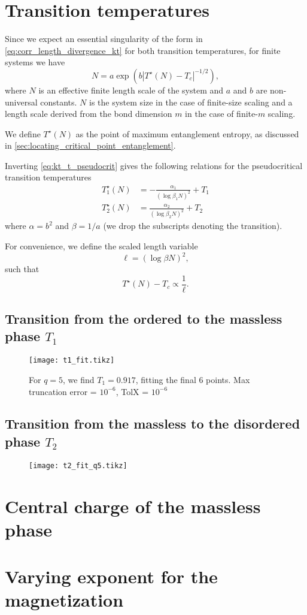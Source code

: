 \section{Transition temperatures}

Since we expect an essential singularity of the form in \autoref{eq:corr_length_divergence_kt} for both transition
temperatures, for finite systems we have
\begin{equation}\label{eq:kt_t_pseudocrit}
  N = a \exp \left( b |T^{\star}(N) - T_c|^{-1/2}  \right),
\end{equation}
where $N$ is an effective finite length scale of the system and $a$ and $b$ are non-universal constants.
$N$ is the system size in the case of finite-size scaling and a length scale derived from the bond dimension $m$ in the
case of finite-$m$ scaling.

We define $T^{\star}(N)$ as the point of maximum entanglement entropy, as discussed in
\autoref{sec:locating_critical_point_entanglement}.

Inverting \autoref{eq:kt_t_pseudocrit} gives the following relations for the pseudocritical transition temperatures
\begin{align}
  T^{\star}_{1}(N) &= -\frac{\alpha_1}{(\log \beta_1 N)^2} + T_1 \\
  T^{\star}_{2}(N) &= \frac{\alpha_2}{(\log \beta_2 N)^2} + T_2
\end{align}
where $\alpha = b^2$ and $\beta = 1/a$ (we drop the subscripts denoting the transition).

For convenience, we define the scaled length variable
\begin{equation}
  \ell = (\log \beta N)^2,
\end{equation}
such that
\begin{equation}
  T^{\star}(N) - T_c \propto \frac{1}{\ell}.
\end{equation}

\subsection{Transition from the ordered to the massless phase $T_1$}

\begin{figure}
  \texttt{[image: t1\_fit.tikz]}
  \caption{For $q = 5$, we find $T_1 = 0.917$, fitting the final 6 points.
  Max truncation error = $10^{-6}$, TolX = $10^{-6}$}\label{figure:t1_fit}
\end{figure}

\subsection{Transition from the massless to the disordered phase $T_2$}

\begin{figure}
  \texttt{[image: t2\_fit\_q5.tikz]}
  \caption{}\label{figure:t2_fit_q5}
\end{figure}


\section{Central charge of the massless phase}

\section{Varying exponent for the magnetization}
